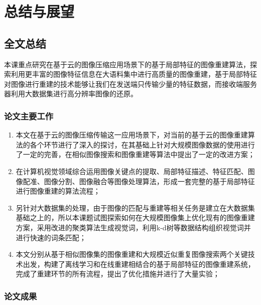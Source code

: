 
\chapter{总结与展望}

\section{全文总结}

本课重点研究在基于云的图像压缩应用场景下的基于局部特征的图像重建算法，探索利用更丰富的图像特征信息在大语料集中进行高质量的图像重建，基于局部特征对图像进行重建的技术能够让我们在发送端只传输少量的特征数据，而接收端服务器利用大数据集进行高分辨率图像的还原。

\subsection{论文主要工作}

\begin{enumerate}
\item 本文在基于云的图像压缩传输这一应用场景下，对当前的基于云的图像重建算法的各个环节进行了深入的探讨，在其基础上针对大规模图像数据的使用进行了一定的完善，在相似图像搜索和图像重建等算法中提出了一定的改进方案；
\item 在计算机视觉领域综合运用图像关键点的提取、局部特征描述、特征匹配、图像配准、图像分割、图像融合等图像处理算法，形成一套完整的基于局部特征进行图像重建的算法流程；
\item 另针对大数据集的处理，由于图像的匹配与重建等相关任务是建立在大数据集基础之上的，所以本课题试图探索如何在大规模图像集上优化现有的图像重建方案，采用改进的聚类算法生成视觉词，利用k-d树等数据结构组织视觉词并进行快速的词条匹配；
\item 本文分别从基于相似图像集的图像重建和大规模近似重复图像搜索两个关键技术出发，构建了离线学习和在线重建相结合的基于局部特征的图像重建系统，完成了重建环节的所有流程，提出了优化措施并进行了大量实验；
\end{enumerate}

\subsection{论文成果}

